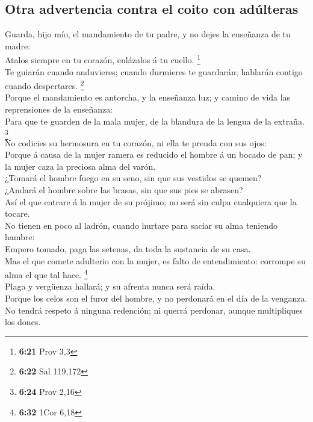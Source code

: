 \hypertarget{otra-advertencia-contra-el-coito-con-aduxfalteras}{%
\subsection{Otra advertencia contra el coito con
adúlteras}\label{otra-advertencia-contra-el-coito-con-aduxfalteras}}

 Guarda, hijo mío, el mandamiento de tu padre, y no dejes
la enseñanza de tu madre:\\
 Atalos siempre en tu corazón, enlázalos á tu cuello.
\footnote{\textbf{6:21} Prov 3,3}\\
 Te guiarán cuando anduvieres; cuando durmieres te
guardarán; hablarán contigo cuando despertares. \footnote{\textbf{6:22}
  Sal 119,172}\\
 Porque el mandamiento es antorcha, y la enseñanza luz; y
camino de vida las reprensiones de la enseñanza:\\
 Para que te guarden de la mala mujer, de la blandura de la
lengua de la extraña. \footnote{\textbf{6:24} Prov 2,16}\\
 No codicies su hermosura en tu corazón, ni ella te prenda
con sus ojos:\\
 Porque á causa de la mujer ramera es reducido el hombre á
un bocado de pan; y la mujer caza la preciosa alma del varón.\\
 ¿Tomará el hombre fuego en su seno, sin que sus vestidos
se quemen?\\
 ¿Andará el hombre sobre las brasas, sin que sus pies se
abrasen?\\
 Así el que entrare á la mujer de su prójimo; no será sin
culpa cualquiera que la tocare.\\
 No tienen en poco al ladrón, cuando hurtare para saciar su
alma teniendo hambre:\\
 Empero tomado, paga las setenas, da toda la sustancia de
su casa.\\
 Mas el que comete adulterio con la mujer, es falto de
entendimiento: corrompe su alma el que tal hace. \footnote{\textbf{6:32}
  1Cor 6,18}\\
 Plaga y vergüenza hallará; y su afrenta nunca será
raída.\\
 Porque los celos son el furor del hombre, y no perdonará
en el día de la venganza.\\
 No tendrá respeto á ninguna redención; ni querrá perdonar,
aunque multipliques los dones.

